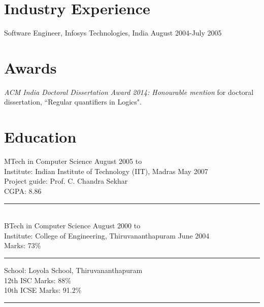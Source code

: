 \documentclass[margin]{res}
\begin{document}
\begin{resume}
\section{Industry Experience}
Software Engineer, Infosys Technologies, India \hfill August 2004-July 2005


\section{Awards}
\emph{ACM India Doctoral Dissertation Award 2014: Honourable mention} for doctoral dissertation, ``Regular quantifiers in Logics".

\section{Education} 
					MTech in Computer Science \hfill August 2005 to \\
					Institute: Indian Institute of Technology (IIT), Madras \hfill May 2007 \\
					Project guide: Prof. C. Chandra Sekhar \\
					CGPA: 8.86 \\
					\noindent\rule{13cm}{0.4pt} \\
					BTech in Computer Science \hfill August 2000 to \\
					Institute: College of Engineering, Thiruvananthapuram \hfill June 2004 \\
					Marks: 73\% \\
					\noindent\rule{13cm}{0.4pt} 
					School: Loyola School, Thiruvananthapuram \\
					12th ISC Marks: 88\% \\
					10th ICSE Marks: 91.2\% \\
					\noindent\rule{13cm}{0.4pt} 

 

\end{resume}
\end{document}
